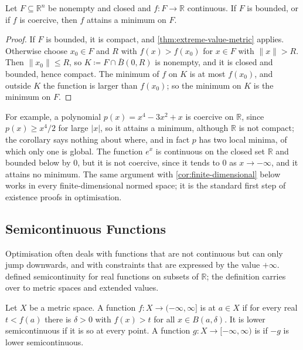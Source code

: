 \begin{corollary}
\label{cor:coercive-minimum}
Let $F\subseteq\mathbb R^n$ be nonempty and closed and $f\colon F\to\mathbb R$ continuous. If $F$ is bounded, or if $f$ is coercive, then $f$ attains a minimum on $F$.
\end{corollary}

\begin{proof}
If $F$ is bounded, it is compact, and \cref{thm:extreme-value-metric} applies. Otherwise choose $x_0\in F$ and $R$ with $f(x)>f(x_0)$ for $x\in F$ with $\|x\|>R$. Then $\|x_0\|\le R$, so $K\coloneqq F\cap\bar B(0,R)$ is nonempty, and it is closed and bounded, hence compact. The minimum of $f$ on $K$ is at most $f(x_0)$, and outside $K$ the function is larger than $f(x_0)$; so the minimum on $K$ is the minimum on $F$.
\end{proof}

For example, a polynomial $p(x)=x^4-3x^2+x$ is coercive on $\mathbb R$, since $p(x)\ge x^4/2$ for large $|x|$, so it attains a minimum, although $\mathbb R$ is not compact; the corollary says nothing about where, and in fact $p$ has two local minima, of which only one is global. The function $e^x$ is continuous on the closed set $\mathbb R$ and bounded below by $0$, but it is not coercive, since it tends to $0$ as $x\to-\infty$, and it attains no minimum. The same argument with \cref{cor:finite-dimensional} below works in every finite-dimensional normed space; it is the standard first step of existence proofs in optimisation.

\subsection{Semicontinuous Functions}

Optimisation often deals with functions that are not continuous but can only jump downwards, and with constraints that are expressed by the value $+\infty$.  defined semicontinuity for real functions on subsets of $\mathbb R$; the definition carries over to metric spaces and extended values.

\begin{definition}
\label{def:semicontinuous-metric}
Let $X$ be a metric space. A function $f\colon X\to(-\infty,\infty]$ is  at $a\in X$ if for every real $t<f(a)$ there is $\delta>0$ with $f(x)>t$ for all $x\in B(a,\delta)$. It is lower semicontinuous if it is so at every point. A function $g\colon X\to[-\infty,\infty)$ is  if $-g$ is lower semicontinuous.
\end{definition}

